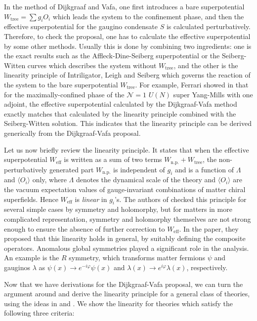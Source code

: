 \documentclass[a4paper,12pt]{article}
\def\ex#1{\langle#1\rangle}
\def\W#1{W_{\text{#1}}}
\def\Nis{\mathcal{N}=}
\begin{document}
In the method of Dijkgraaf and Vafa,
one first introduces a bare superpotential $\W{tree}=\sum g_iO_i$
which leads the system to the confinement phase,
and then the effective superpotential for the gaugino condensate $S$
is calculated perturbatively.
Therefore, to check the proposal,
one has to calculate the effective superpotential
by some other methods. Usually this is done by combining two ingredients:
one is the exact results
such as the Affleck-Dine-Seiberg superpotential or the Seiberg-Witten curves
which describes the system without $\W{tree}$,
and the other is the linearity principle of Intriligator, Leigh and Seiberg
\cite{Intriligator:1994jr}\cite{Intriligator:1994uk}
which governs the reaction of the system
to the bare superpotential $\W{tree}$.
For example, Ferrari showed in \cite{Ferrari:2002jp} that 
for the maximally-confined phase of
the $\Nis1$ $U(N)$ super Yang-Mills with one adjoint,
the effective superpotential calculated by the Dijkgraaf-Vafa method
exactly matches that calculated by the linearity principle
combined with the Seiberg-Witten solution. This indicates that the linearity
principle can be derived generically from the Dijkgraaf-Vafa proposal.


Let us now briefly review the linearity principle.
It states that when the effective superpotential
$\W{eff}$ is written as a sum of two terms $\W{n.p.}+\W{tree}$,
the non-perturbatively generated part $\W{n.p.}$
is independent of $g_i$ and is a function of
$\Lambda$ and $\ex{O_i}$ only, where $\Lambda$ denotes
the dynamical scale of the theory and $\ex{O_i}$
are the vacuum expectation values of
gauge-invariant combinations of matter chiral superfields.
Hence $\W{eff}$ is \textit{linear} in $g_i$'s.
The authors of \cite{Intriligator:1994jr}\cite{Intriligator:1994uk}
checked this principle for several simple cases by symmetry and holomorphy,
but for matters in more complicated representation,
symmetry and holomorphy themselves are not strong enough to ensure 
the absence of further correction to $\W{eff}$.
In the paper,
they proposed that
this linearity holds in general,
by suitably defining the composite operators.
Anomalous global symmetries played a significant role in the analysis.
An example is the $R$ symmetry, which transforms matter fermions $\psi$ 
and gauginos $\lambda$ as
$\psi(x)\to e^{-i\varphi}\psi(x)$ and
$\lambda (x)\to e^{i\varphi}\lambda(x)$,
respectively.

Now that we have derivations for the Dijkgraaf-Vafa proposal,
we can turn the argument around and 
derive the linearity principle 
for a general class of theories,
using the ideas in \cite{Dijkgraaf:2002xd} and
\cite{Cachazo:2002ry}.
We show the linearity for theories which
satisfy the following three criteria:
\end{document}
